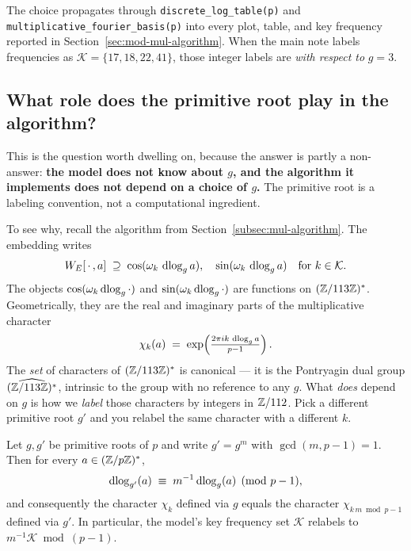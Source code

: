 The choice propagates through \texttt{discrete\_log\_table(p)} and
\texttt{multiplicative\_fourier\_basis(p)} into every plot, table, and key
frequency reported in Section~\ref{sec:mod-mul-algorithm}.  When the main
note labels frequencies as $\mathcal K = \{17, 18, 22, 41\}$, those integer
labels are \emph{with respect to} $g = 3$.

\subsection{What role does the primitive root play in the algorithm?}
\label{subsec:role-of-g}

This is the question worth dwelling on, because the answer is partly a
non-answer: \textbf{the model does not know about $g$, and the algorithm it
implements does not depend on a choice of $g$.}  The primitive root is a
labeling convention, not a computational ingredient.

To see why, recall the algorithm from
Section~\ref{subsec:mul-algorithm}.  The embedding writes
\begin{equation}
  W_E[\,\cdot\,, a] \;\supseteq\;
    \cos(\omega_k\, \operatorname{dlog}_g a), \quad
    \sin(\omega_k\, \operatorname{dlog}_g a)
  \quad \text{for } k \in \mathcal K.
  \label{eq:embed-recap}
\end{equation}
The objects $\cos(\omega_k \operatorname{dlog}_g \cdot)$ and $\sin(\omega_k \operatorname{dlog}_g \cdot)$
are functions on $(\mathbb{Z}/113\mathbb{Z})^*$.  Geometrically, they are the real and
imaginary parts of the multiplicative character
\begin{equation}
  \chi_k(a) \;=\; \exp\!\left(\tfrac{2\pi i k\, \operatorname{dlog}_g a}{p-1}\right).
  \label{eq:char}
\end{equation}
The \emph{set} of characters of $(\mathbb{Z}/113\mathbb{Z})^*$ is canonical --- it is the
Pontryagin dual group $\widehat{(\mathbb{Z}/113\mathbb{Z})^*}$, intrinsic to the group with
no reference to any $g$.  What \emph{does} depend on $g$ is how we
\emph{label} those characters by integers in $\mathbb{Z}/112$.  Pick a different
primitive root $g'$ and you relabel the same character with a different $k$.

\begin{proposition}
\label{prop:relabel}
Let $g, g'$ be primitive roots of $p$ and write $g' = g^{m}$ with
$\gcd(m, p-1) = 1$.  Then for every $a \in (\mathbb{Z}/p\mathbb{Z})^*$,
\begin{equation}
  \operatorname{dlog}_{g'}(a) \;\equiv\; m^{-1} \operatorname{dlog}_g(a) \pmod{p-1},
  \label{eq:relabel}
\end{equation}
and consequently the character $\chi_k$ defined via $g$ equals the character
$\chi_{k \, m \bmod p-1}$ defined via $g'$.  In particular, the model's key
frequency set $\mathcal K$ relabels to $m^{-1} \mathcal K \bmod (p-1)$.
\end{proposition}

